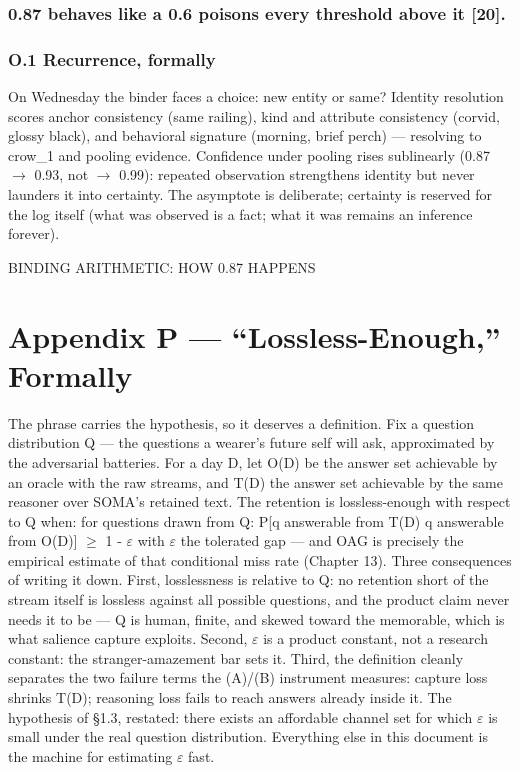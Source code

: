 \subsection{0.87 behaves like a 0.6 poisons every threshold above it {[}20{]}.}\label{behaves-like-a-0.6-poisons-every-threshold-above-it-20.}

\subsection{O.1 Recurrence, formally}\label{o.1-recurrence-formally}

On Wednesday the binder faces a choice: new entity or same? Identity resolution scores anchor consistency (same railing), kind and attribute consistency (corvid, glossy black), and behavioral signature (morning, brief perch) --- resolving to crow\_1 and pooling evidence. Confidence under pooling rises sublinearly (0.87 \(\rightarrow\) 0.93, not \(\rightarrow\) 0.99): repeated observation strengthens identity but never launders it into certainty. The asymptote is deliberate; certainty is reserved for the log itself (what was observed is a fact; what it was remains an inference forever).

BINDING ARITHMETIC: HOW 0.87 HAPPENS

\chapter*{Appendix P --- ``Lossless-Enough,'' Formally}\label{appendix-p-lossless-enough-formally}

The phrase carries the hypothesis, so it deserves a definition. Fix a question distribution Q --- the questions a wearer's future self will ask, approximated by the adversarial batteries. For a day D, let O(D) be the answer set achievable by an oracle with the raw streams, and T(D) the answer set achievable by the same reasoner over SOMA's retained text. The retention is lossless-enough with respect to Q when: for questions drawn from Q: P{[}q answerable from T(D) \textbar{} q answerable from O(D){]} \(\geq\) 1 - \(\varepsilon\) with \(\varepsilon\) the tolerated gap --- and OAG is precisely the empirical estimate of that conditional miss rate (Chapter 13). Three consequences of writing it down. First, losslessness is relative to Q: no retention short of the stream itself is lossless against all possible questions, and the product claim never needs it to be --- Q is human, finite, and skewed toward the memorable, which is what salience capture exploits. Second, \(\varepsilon\) is a product constant, not a research constant: the stranger-amazement bar sets it. Third, the definition cleanly separates the two failure terms the (A)/(B) instrument measures: capture loss shrinks T(D); reasoning loss fails to reach answers already inside it. The hypothesis of \S{}1.3, restated: there exists an affordable channel set for which \(\varepsilon\) is small under the real question distribution. Everything else in this document is the machine for estimating \(\varepsilon\) fast.

